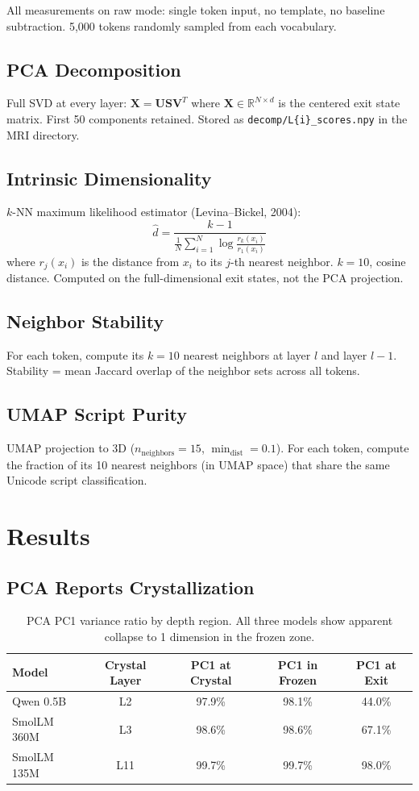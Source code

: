 \documentclass[11pt]{article}
\begin{document}
All measurements on raw mode: single token input, no template, no baseline subtraction. 5,000 tokens randomly sampled from each vocabulary.

\subsection{PCA Decomposition}
Full SVD at every layer: $\mathbf{X} = \mathbf{U}\mathbf{S}\mathbf{V}^T$ where $\mathbf{X} \in \mathbb{R}^{N \times d}$ is the centered exit state matrix. First 50 components retained. Stored as \texttt{decomp/L\{i\}\_scores.npy} in the MRI directory.

\subsection{Intrinsic Dimensionality}
$k$-NN maximum likelihood estimator (Levina--Bickel, 2004):
\[
\hat{d} = \frac{k-1}{\frac{1}{N}\sum_{i=1}^{N} \log\frac{r_k(x_i)}{r_1(x_i)}}
\]
where $r_j(x_i)$ is the distance from $x_i$ to its $j$-th nearest neighbor. $k=10$, cosine distance. Computed on the full-dimensional exit states, not the PCA projection.

\subsection{Neighbor Stability}
For each token, compute its $k=10$ nearest neighbors at layer $l$ and layer $l-1$. Stability = mean Jaccard overlap of the neighbor sets across all tokens.

\subsection{UMAP Script Purity}
UMAP projection to 3D ($n_{\text{neighbors}}=15$, $\min_{\text{dist}}=0.1$). For each token, compute the fraction of its 10 nearest neighbors (in UMAP space) that share the same Unicode script classification.

\section{Results}

\subsection{PCA Reports Crystallization}

\begin{table}[h]
\centering
\begin{tabular}{lcccc}
\toprule
Model & Crystal Layer & PC1 at Crystal & PC1 in Frozen & PC1 at Exit \\
\midrule
Qwen 0.5B & L2 & 97.9\% & 98.1\% & 44.0\% \\
SmolLM 360M & L3 & 98.6\% & 98.6\% & 67.1\% \\
SmolLM 135M & L11 & 99.7\% & 99.7\% & 98.0\% \\
\bottomrule
\end{tabular}
\caption{PCA PC1 variance ratio by depth region. All three models show apparent collapse to 1 dimension in the frozen zone.}
\end{table}
\end{document}
